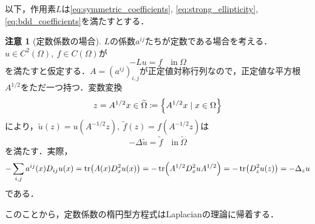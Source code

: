 \documentclass[a4paper]{ltjsarticle}
\newcommand{\Om}{\Omega}
\newcommand{\inn}{\quad\text{in}\ }
\newcommand{\1}{\mathbbm{1}}
\numberwithin{equation}{section}
\theoremstyle{definition}
\newtheorem{rmk}[thm]{注意}
\begin{document}
以下，作用素$L$は\eqref{eq:symmetric_coefficients}, \eqref{eq:strong_ellipticity}, \eqref{eq:bdd_coefficients}を満たすとする．
\begin{rmk}[定数係数の場合]\label{rmk:const_coefficients}
    $L$の係数$a^{ij}$たちが定数である場合を考える．$u\in C^2(\Om),\ f\in C(\Om)$が
    \begin{equation}
        -Lu=f\inn \Om 
    \end{equation}
    を満たすと仮定する．$A=(a^{ij})_{i,j}$が正定値対称行列なので，正定値な平方根$A^{1/2}$をただ一つ持つ．変数変換
    \begin{equation}
        z=A^{1/2}x\in\widetilde{\Om}\coloneqq \qty{A^{1/2}x\mid x\in \Om }
    \end{equation}
    により，$\widetilde{u}(z)=u(A^{-1/2}z),\ \widetilde{f}(z)=f(A^{-1/2}z)$は
    \begin{equation}
        -\Delta \widetilde{u}=\widetilde{f}\inn \widetilde{\Om} 
    \end{equation}
    を満たす．実際，
    \begin{equation}
        -\sum_{i,j}a^{ij}(x)D_{ij}u(x)=\tr(A(x)D^2_xu(x))=-\tr(A^{1/2}D^2_xu A^{1/2})=-\tr(D^2_z u(z))=-\Delta_z u
    \end{equation}
    である．

    このことから，定数係数の楕円型方程式はLaplacianの理論に帰着する．
\end{rmk}
\end{document}
